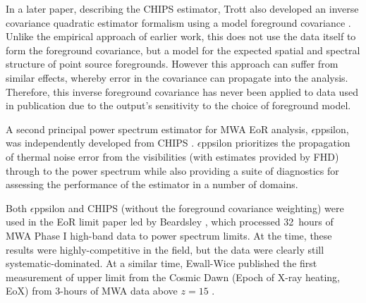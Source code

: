 In a later paper, describing the CHIPS estimator, Trott also developed an inverse covariance quadratic estimator formalism using a model foreground covariance \cite{trottchips2016}. Unlike the empirical approach of earlier work, this does not use the data itself to form the foreground covariance, but a model for the expected spatial and spectral structure of point source foregrounds. However this approach can suffer from similar effects, whereby error in the covariance can propagate into the analysis. Therefore, this inverse foreground covariance has never been applied to data used in publication due to the output's sensitivity to the choice of foreground model.

A second principal power spectrum estimator for MWA EoR analysis, $\epsilon$ppsilon, was independently developed from CHIPS \cite{barry19}. $\epsilon$ppsilon prioritizes the propagation of thermal noise error from the visibilities (with estimates provided by FHD) through to the power spectrum while also providing a suite of diagnostics for assessing the performance of the estimator in a number of domains.

Both $\epsilon$ppsilon and CHIPS (without the foreground covariance weighting) were used in the EoR limit paper led by Beardsley \cite{beardsley16}, which processed 32~hours of MWA Phase I high-band data to power spectrum limits.
At the time, these results were highly-competitive in the field, but the data were clearly still systematic-dominated. At a similar time, Ewall-Wice published the first measurement of upper limit from the Cosmic Dawn (Epoch of X-ray heating, EoX) from 3-hours of MWA data above $z=15$ \cite{ewall-wice16}.

